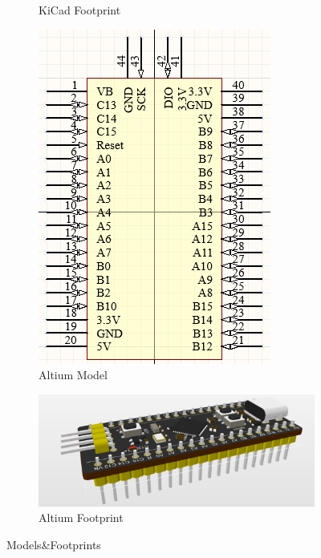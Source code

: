 \begin{figure}[H]
\begin{subfigure}{0.1\textwidth}
    \caption{KiCad Footprint}
    \label{fig:KiCadFootprint}
    \end{subfigure}
        \hfill
    \begin{subfigure}{0.2\textwidth}
        \includegraphics[width=\linewidth]{img//blackpill/AltiumMODEL.png}
        \caption{Altium Model}
        \label{fig:AltiumModel}
    \end{subfigure}
    \hfill
    \begin{subfigure}{0.2\textwidth}
        \includegraphics[width=\linewidth]{img//blackpill/AltiumFOOTPRINT.png}
    \caption{Altium Footprint}
    \label{fig:AltiumFootprint}
    \end{subfigure}
      \caption{Models\&Footprints}
  \label{fig:KiCadPCB}
\end{figure}


